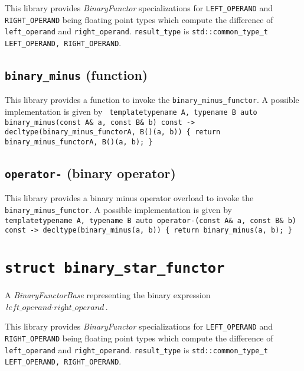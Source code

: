 \documentclass[oneside]{book}
\begin{document}
\noindent{}This library provides \textit{BinaryFunctor}         specializations for
\texttt{LEFT\_OPERAND} and   \texttt{RIGHT\_OPERAND} being     floating point types
which compute the difference of \texttt{left\_operand} and \texttt{right\_operand}.
\texttt{result\_type} is \texttt{std::common\_type\_t  \textlangle   LEFT\_OPERAND,
RIGHT\_OPERAND\textrangle}.

\subsection{\texttt{binary\_minus} (function)}
This library provides a function to invoke the \texttt{binary\_minus\_functor}.
A possible implementation is given by\newline
\texttt{
template\textlangle typename A, typename B\textrangle\newline
auto binary\_minus(const A\& a, const B\& b) const -> decltype(binary\_minus\_functor\textlangle A, B\textrangle()(a, b))\newline
\{ return binary\_minus\_functor\textlangle A, B\textrangle()(a, b); \}
}

\subsection{\texttt{operator-} (binary operator)}
This library provides a binary minus operator overload to invoke the \texttt{binary\_minus\_functor}.
A possible implementation is given by\newline
\texttt{
template\textlangle typename A, typename B\textrangle\newline
auto operator-(const A\& a, const B\& b) const -> decltype(binary\_minus(a, b))\newline
\{ return binary\_minus(a, b); \}
}

\section{\texttt{struct binary\_star\_functor}}
A \textit{BinaryFunctorBase} representing the binary expression $\textit{left\_operand} \cdot \textit{right\_operand}$.\newline

\noindent{}This library provides \textit{BinaryFunctor}         specializations for
\texttt{LEFT\_OPERAND} and   \texttt{RIGHT\_OPERAND} being     floating point types
which compute the difference of \texttt{left\_operand} and \texttt{right\_operand}.
\texttt{result\_type} is \texttt{std::common\_type\_t  \textlangle   LEFT\_OPERAND,
RIGHT\_OPERAND\textrangle}.
\end{document}
